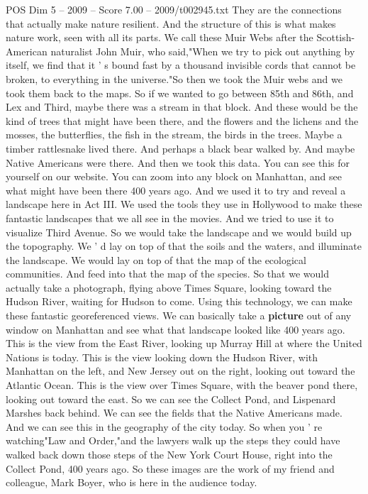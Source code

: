\begin{textsample}{POS Dim 5 – 2009 – Score 7.00 – 2009/t002945.txt}
They are the connections that actually make nature resilient.
And the structure of this is what makes nature work, seen with all its parts.
We call these Muir Webs after the Scottish-American naturalist John Muir, who said,"When we try to pick out anything by itself, we find that it ' s bound fast by a thousand invisible cords that cannot be broken, to everything in the universe."So then we took the Muir webs and we took them back to the maps.
So if we wanted to go between 85th and 86th, and Lex and Third, maybe there was a stream in that block.
And these would be the kind of trees that might have been there, and the flowers and the lichens and the mosses, the butterflies, the fish in the stream, the birds in the trees.
Maybe a timber rattlesnake lived there.
And perhaps a black bear walked by.
And maybe Native Americans were there.
And then we took this data.
You can see this for yourself on our website.
You can zoom into any block on Manhattan, and see what might have been there 400 years ago.
And we used it to try and reveal a landscape here in Act III.
We used the tools they use in Hollywood to make these fantastic landscapes that we all see in the movies.
And we tried to use it to visualize Third Avenue.
So we would take the landscape and we would build up the topography.
We ' d lay on top of that the soils and the waters, and illuminate the landscape.
We would lay on top of that the map of the ecological communities.
And feed into that the map of the species.
So that we would actually take a photograph, flying above Times Square, looking toward the Hudson River, waiting for Hudson to come.
Using this technology, we can make these fantastic georeferenced views.
We can basically take a \textbf{picture} out of any window on Manhattan and see what that landscape looked like 400 years ago.
This is the view from the East River, looking up Murray Hill at where the United Nations is today.
This is the view looking down the Hudson River, with Manhattan on the left, and New Jersey out on the right, looking out toward the Atlantic Ocean.
This is the view over Times Square, with the beaver pond there, looking out toward the east.
So we can see the Collect Pond, and Lispenard Marshes back behind.
We can see the fields that the Native Americans made.
And we can see this in the geography of the city today.
So when you ' re watching"Law and Order,"and the lawyers walk up the steps they could have walked back down those steps of the New York Court House, right into the Collect Pond, 400 years ago.
So these images are the work of my friend and colleague, Mark Boyer, who is here in the audience today.

\end{textsample}
